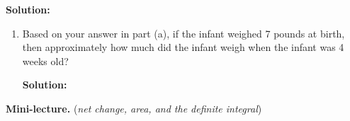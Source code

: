 \documentclass[10pt]{article}
\newcommand{\solution}{%
  \vspace{0.2in}%
  \noindent\textbf{\color{blue}Solution: }%
}
\begin{document}
\solution
{}





\begin{enumerate}


\item[(b)] Based on your answer in part (a), if the infant weighed 7 pounds at birth, then approximately how much did the infant weigh when the infant was 4 weeks old?

\solution
{}
\end{enumerate}
\newpage
{\bf\color{blue}Mini-lecture.} ({\it net change, area, and the definite integral})
\end{document}
